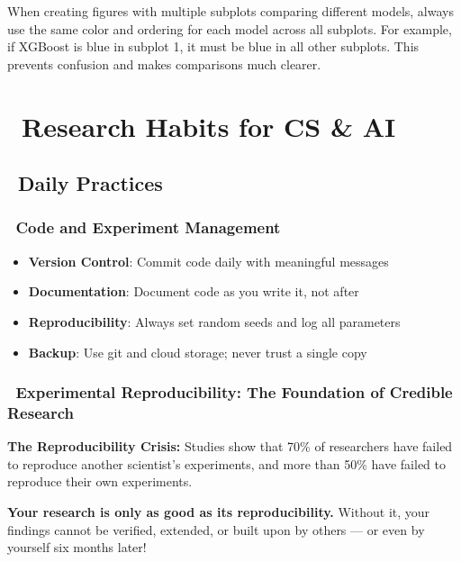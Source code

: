 \documentclass[11pt,a4paper]{article}
\begin{document}
\begin{tcolorbox}[colback=yellow!5,colframe=orange!60,title={\faExclamationTriangle~Note: Multi-Subplot Consistency}]
When creating figures with multiple subplots comparing different models, always use the same color and ordering for each model across all subplots. For example, if XGBoost is blue in subplot 1, it must be blue in all other subplots. This prevents confusion and makes comparisons much clearer.
\end{tcolorbox}

\section{\faFlask~Research Habits for CS \& AI}

\subsection{\faClock~Daily Practices}

\subsubsection{\faCode~Code and Experiment Management}
\begin{itemize}
    \item \textbf{Version Control}: Commit code daily with meaningful messages
    \item \textbf{Documentation}: Document code as you write it, not after
    \item \textbf{Reproducibility}: Always set random seeds and log all parameters
    \item \textbf{Backup}: Use git and cloud storage; never trust a single copy
\end{itemize}

\subsubsection{\faSync~Experimental Reproducibility: The Foundation of Credible Research}

\begin{tcolorbox}[colback=blue!5,colframe=blue!40,title={\faExclamationCircle~Why Reproducibility Matters}]
\textbf{The Reproducibility Crisis:} Studies show that 70\% of researchers have failed to reproduce another scientist's experiments, and more than 50\% have failed to reproduce their own experiments.

\textbf{Your research is only as good as its reproducibility.} Without it, your findings cannot be verified, extended, or built upon by others — or even by yourself six months later!
\end{tcolorbox}
\end{document}
